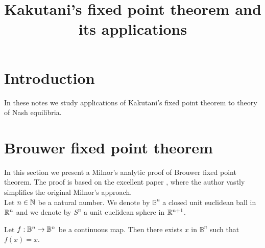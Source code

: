 



\title{Kakutani's fixed point theorem and its applications}
\date{}
\maketitle

\section{Introduction}
In these notes we study applications of Kakutani's fixed point theorem to theory of Nash equilibria.

\section{Brouwer fixed point theorem}
\noindent
In this section we present a Milnor's analytic proof of Brouwer fixed point theorem. The proof is based on the excellent paper \cite{BrouwerRogers}, where the author vastly simplifies the original Milnor's approach.\\
Let $n\in {\mathbb N}$ be a natural number. We denote by $\mathbb{B}^n$ a closed unit euclidean ball in ${\mathbb R}^n$ and we denote by $S^n$ a unit euclidean sphere in ${\mathbb R}^{n+1}$.

\begin{theorem}
Let $f:\mathbb{B}^n\rightarrow \mathbb{B}^n$ be a continuous map. Then there exists $x$ in $\mathbb{B}^n$ such that $f(x) = x$.
\end{theorem}

